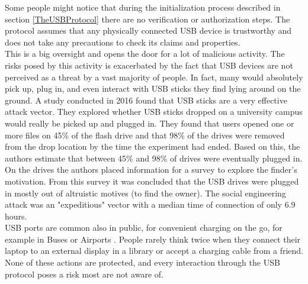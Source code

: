 Some people might notice that during the initialization process described in section \ref{TheUSBProtocol} there are no verification or authorization steps. The protocol assumes that any physically connected USB device is trustworthy and does not take any precautions to check its claims and properties. \\
This is a big oversight and opens the door for a lot of malicious activity. 
The risks posed by this activity is exacerbated by the fact that USB devices are not perceived as a threat by a vast majority of people. In fact, many would absolutely pick up, plug in, and even interact with USB sticks they find lying around on the ground. A study \cite{tischerUsersReallyPlug2016} conducted in 2016 found that USB sticks are a very effective attack vector. They explored whether USB sticks dropped on a university campus would really be picked up and plugged in. They found that users opened one or more files on 45\% of the flash drive and that 98\% of the drives were removed from the drop location by the time the experiment had ended. Based on this, the authors estimate that between 45\% and 98\% of drives were eventually plugged in. On the drives the authors placed information for a survey to explore the finder's motivation. From this survey it was concluded that the USB drives were plugged in mostly out of altruistic motives (to find the owner). The social engineering attack was an "expeditious" vector with a median time of connection of only 6.9 hours.  \\
USB ports are common also in public, for convenient charging on the go, for example in Buses or Airports \cite{kumarJuiceJackingUSB2020}. People rarely think twice when they connect their laptop to an external display in a library or accept a charging cable from a friend. None of these actions are protected, and every interaction through the USB protocol poses a risk most are not aware of.

